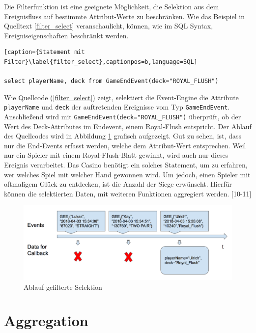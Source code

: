 Die Filterfunktion ist eine geeignete Möglichkeit, die Selektion aus dem Ereignisfluss auf bestimmte Attribut-Werte zu beschränken. Wie das Beispiel in Quelltext \ref{filter_select} veranschaulicht, können, wie im SQL Syntax, Ereigniseigenschaften beschränkt werden.
\begin{lstlisting}[caption={Statement mit Filter}\label{filter_select},captionpos=b,language=SQL]

select playerName, deck from GameEndEvent(deck="ROYAL_FLUSH")

\end{lstlisting}
Wie Quellcode (\ref{filter_select}) zeigt, selektiert die Event-Engine die Attribute \texttt{playerName} und \texttt{deck} der auftretenden Ereignisse vom Typ \texttt{GameEndEvent}. Anschließend wird mit \texttt{GameEndEvent(deck="ROYAL\_FLUSH")} überprüft, ob der Wert des Deck-Attributes im Endevent, einem Royal-Flush entspricht.
Der Ablauf des Quellcodes wird in Abbildung \ref{filter_select_img} grafisch aufgezeigt. Gut zu sehen, ist, dass nur die End-Events erfasst werden, welche dem Attribut-Wert entsprechen. Weil nur ein Spieler mit einem Royal-Flush-Blatt gewinnt, wird auch nur dieses Ereignis verarbeitet.
Das Casino benötigt ein solches Statement, um zu erfahren, wer welches Spiel mit welcher Hand gewonnen wird. Um jedoch, einen Spieler mit oftmaligem Glück zu entdecken, ist die Anzahl der Siege erwünscht. Hierfür können die selektierten Daten, mit weiteren Funktionen aggregiert werden.
\cite{EsperRef2018}[10-11]
\begin{figure}[ht]
	\centering
	\includegraphics[width=\textwidth,height=\textheight, keepaspectratio]{images/statement_basic_filter.png}
	\caption{Ablauf gefilterte Selektion}
	\label{filter_select_img}
\end{figure}

\section{Aggregation}

